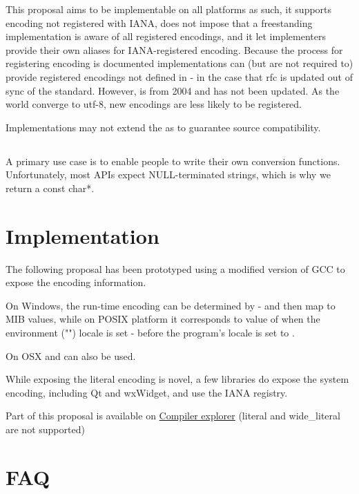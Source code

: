 \documentclass{wg21}
\begin{document}
This proposal aims to be implementable on all platforms as such, it supports encoding not registered with IANA, does not impose that
a freestanding implementation is aware of all registered encodings, and it let implementers provide their own aliases for IANA-registered encoding.
Because the process for registering encoding is documented \cite{rfc2978} implementations can (but are not required to) provide
registered encodings not defined in \cite{rfc3808} - in the case that rfc is updated out of sync of the standard.
However, \cite{rfc3808} is from 2004 and has not been updated. As the world converge to utf-8, new encodings are less likely to
be registered.

Implementations may not extend the  as to guarantee source compatibility.

\subsection{}

A primary use case is to enable people to write their own conversion functions.
Unfortunately, most APIs expect NULL-terminated strings, which is why we return a const char*.

\section{Implementation}

The following proposal has been prototyped using a modified version of GCC to expose the encoding information.

On Windows, the run-time encoding can be determined by  - and then map to MIB values, while on POSIX platform it corresponds to value of  when the environment ("") locale is set - before the program's locale is set to .

On OSX  and  can also be used.


While exposing the literal encoding is novel, a few libraries do expose the system encoding, including Qt and wxWidget, and use the IANA registry.

Part of this proposal is available on \href{https://compiler-explorer.com/z/7D3Z3x}{Compiler explorer}
(literal and wide_literal are not supported)


\section{FAQ}
\end{document}
